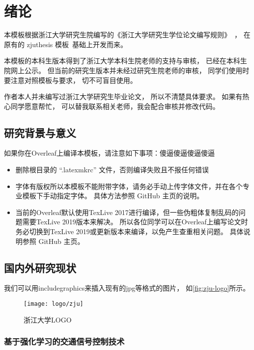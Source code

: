 \chapter{绪论}

本模板根据浙江大学研究生院编写的《浙江大学研究生学位论文编写规则》~\cite{zjugradthesisrules}，
在原有的 zjuthesis 模板~\cite{zjuthesis}基础上开发而来。

本模板的本科生版本\cite{zjuthesisrules}得到了浙江大学本科生院老师的支持与审核，
已经在本科生院网上公示。
但当前的研究生版本并未经过研究生院老师的审核，
同学们使用时要注意对照模板与要求，
切不可盲目使用。

作者本人并未编写过浙江大学研究生毕业论文，
所以不清楚具体要求。
如果有热心同学愿意帮忙，
可以替我联系相关老师，我会配合审核并修改代码。

\section{研究背景与意义}

如果你在Overleaf上编译本模板，请注意如下事项：傻逼傻逼傻逼傻逼

\begin{itemize}
    \item 删除根目录的 ``.latexmkrc'' 文件，否则编译失败且不报任何错误
    \item 字体有版权所以本模板不能附带字体，请务必手动上传字体文件，并在各个专业模板下手动指定字体。
        具体方法参照 GitHub 主页的说明。
    \item 当前的Overleaf默认使用TexLive 2017进行编译，但一些伪粗体复制乱码的问题需要TexLive 2019版本来解决。
        所以各位同学可以在Overleaf上编写论文时务必切换到TexLive 2019或更新版本来编译，以免产生查重相关问题。
        具体说明参照 GitHub 主页。
\end{itemize}


\section{国内外研究现状}

我们可以用includegraphics来插入现有的jpg等格式的图片，
如\autoref{fig:zju-logo}所示。

\begin{figure}[htbp]
    \centering
    \texttt{[image: logo/zju]}
    \caption{\label{fig:zju-logo}浙江大学LOGO}
\end{figure}


\subsection{基于强化学习的交通信号控制技术}
